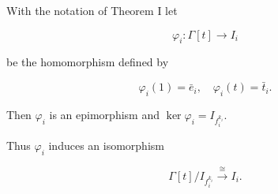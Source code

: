 With the notation of Theorem I let

$$\varphi_i: \Gamma[t] \to I_i$$

be the homomorphism defined by

$$\varphi_i(1) = \bar{e}_i, \quad \varphi_i(t) = \bar{t}_i.$$

Then $\varphi_i$ is an epimorphism and $\ker \varphi_i = I_{f_i^{k_i}}$.

Thus $\varphi_i$ induces an isomorphism

$$\Gamma[t] / I_{f_i^{k_i}} \xrightarrow{\cong} I_i.$$
